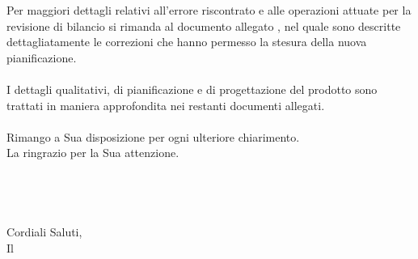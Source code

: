 \documentclass[12pt,a4paper]{article} %
\begin{document}
Per maggiori dettagli relativi all'errore riscontrato e alle operazioni attuate per la revisione di bilancio si rimanda al documento allegato \RB, nel quale sono descritte dettagliatamente le correzioni che hanno permesso la stesura della nuova pianificazione.
\\
\\
\noindent I dettagli qualitativi, di pianificazione e di progettazione del prodotto sono trattati in maniera approfondita nei restanti documenti allegati.
\\
\\
\noindent Rimango a Sua disposizione per ogni ulteriore chiarimento. \\
La ringrazio per la Sua attenzione. \\
\\
\\
\\
\\
Cordiali Saluti, \\
Il \rRPt \\
\gmi
\end{document}
